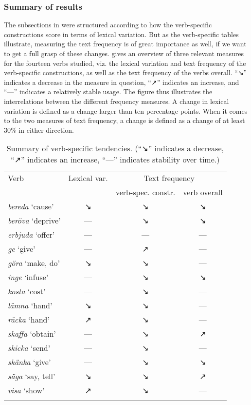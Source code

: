 \documentclass[output=paper]{langscibook}
\begin{document}
\subsubsection{Summary of results}\label{sec:valdeson:5.3.5}


The subsections in  were structured according to how the verb-specific constructions score in terms of lexical variation. But as the verb-specific tables illustrate, measuring the text frequency is of great importance as well, if we want to get a full grasp of these changes.  gives an overview of three relevant measures for the fourteen verbs studied, viz. the lexical variation and text frequency of the verb-specific constructions, as well as the text frequency of the verbs overall. ``↘'' indicates a decrease in the measure in question, ``↗'' indicates an increase, and ``---'' indicates a relatively stable usage. The figure thus illustrates the interrelations between the different frequency measures. A change in lexical variation is defined as a change larger than ten percentage points. When it comes to the two measures of text frequency, a change is defined as a change of at least 30\% in either direction.\largerpage


\begin{table}
\begin{tabular}{lccc}
\lsptoprule
Verb & Lexical var. & \multicolumn{2}{c}{Text frequency}\\\cmidrule(lr){3-4} 
     & & verb-spec. constr. & verb overall\\\midrule
\textit{bereda} ‘cause’ & ↘ & ↘ & ↘\\
\textit{beröva} ‘deprive’ & --- & ↘ & ↘\\
\textit{erbjuda} ‘offer’ & --- & --- & ---\\
\textit{ge} ‘give’ & --- & ↗ & ---\\
\textit{göra} ‘make, do’ & ↘ & ↘ & ---\\
\textit{inge} ‘infuse’ & --- & ↘ & ↘\\
\textit{kosta} ‘cost’ & --- & ↘ & ---\\
\textit{lämna} ‘hand’ & ↘ & ↘ & ---\\
\textit{räcka} ‘hand’ & ↗ & ↘ & ---\\
\textit{skaffa} ‘obtain’ &  --- & ↘ & ↗\\
\textit{skicka} ‘send’ & --- & ↘ & ---\\
\textit{skänka} ‘give’ & --- & ↘ & ↘\\
\textit{säga} ‘say, tell’ & ↘ & ↘ & ↗\\
\textit{visa} ‘show’ & ↗ & ↘ & ---\\
\lspbottomrule
\end{tabular}
\caption{Summary of verb-specific tendencies. (``↘'' indicates a decrease, ``↗'' indicates an increase, ``---'' indicates stability over time.)\label{fig:valdeson:3}}
\end{table}
\end{document}
